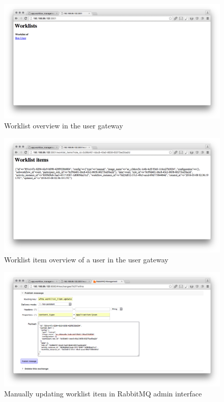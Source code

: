   \begin{figure}[htbp]
    \centering
    \includegraphics[width=\textwidth]{./content/images/usecase/case_study_19.png}
    \caption{Worklist overview in the user gateway}
    \label{fig:wl_index}
  \end{figure}

  \begin{figure}[htbp]
    \centering
    \includegraphics[width=\textwidth]{./content/images/usecase/case_study_20.png}
    \caption{Worklist item overview of a user in the user gateway}
    \label{fig:wl_user}
  \end{figure}

  \begin{figure}[htbp]
    \centering
    \includegraphics[width=\textwidth]{./content/images/usecase/case_study_22.png}
    \caption{Manually updating worklist item in RabbitMQ admin interface}
    \label{fig:wl_update}
  \end{figure}


